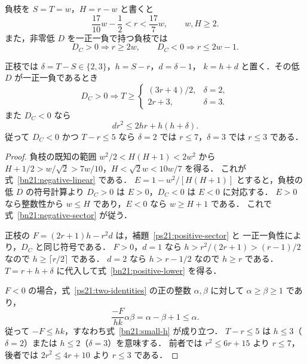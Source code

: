 \begin{lemma}[二つの枝の定量的不等式]\label{bn21:bounds}
負枝を $S=T=w$，$H=r-w$ と書くと
\begin{equation}\label{bn21:negative-linear}
 \frac{17}{10}w-\frac12<r<\frac{17}{7}w,
 \qquad w,H\ge2.
\end{equation}
また，非零低 $D$ を一正一負で持つ負枝では
\begin{equation}\label{bn21:negative-sector}
 D_C>0\Longrightarrow r\ge2w,\qquad
 D_C<0\Longrightarrow r\le2w-1.
\end{equation}

正枝では $\delta=T-S\in\{2,3\}$，$h=S-r$，$d=\delta-1$，
$k=h+d$ と置く．その低 $D$ が一正一負であるとき
\begin{equation}\label{bn21:positive-lower}
 D_C>0\Longrightarrow
 T\ge
 \begin{cases}
 (3r+4)/2,&\delta=2,\\
 2r+3,&\delta=3.
 \end{cases}
\end{equation}
また $D_C<0$ なら
\begin{equation}\label{bn21:small-h}
 d r^2\le2hr+h(h+\delta).
\end{equation}
従って $D_C<0$ かつ $T-r\le5$ なら
$\delta=2$ では $r\le7$，$\delta=3$ では $r\le3$ である．
\end{lemma}

\begin{proof}
負枝の既知の範囲 $w^2/2<H(H+1)<2w^2$ から
$H+1/2>w/\sqrt2>7w/10$，$H<\sqrt2w<10w/7$ を得る．
これが式~\eqref{bn21:negative-linear} である．
$E=1-w^2/[H(H+1)]$ とすると，負枝の低 $D$ の符号計算より
$D_C>0$ は $E>0$，$D_C<0$ は $E<0$ に対応する．
$E>0$ なら整数性から $w\le H$ であり，$E<0$ なら $w\ge H+1$ である．
これで式~\eqref{bn21:negative-sector} が従う．

正枝の $F=(2r+1)h-r^2d$ は，補題~\ref{ps21:positive-sector} と
一正一負性により，$D_C$ と同じ符号である．
$F>0$，$d=1$ なら
$h>r^2/(2r+1)>(r-1)/2$ なので $h\ge\lceil r/2\rceil$ である．
$d=2$ なら $h>r-1/2$ なので $h\ge r$ である．
$T=r+h+\delta$ に代入して式~\eqref{bn21:positive-lower} を得る．

$F<0$ の場合，式~\eqref{ps21:two-identities} の正の整数
$\alpha,\beta$ に対して $\alpha\ge\beta\ge1$ であり，
\[
 \frac{-F}{hk}\alpha\beta=\alpha-\beta+1\le\alpha.
\]
従って $-F\le hk$，すなわち式~\eqref{bn21:small-h} が成り立つ．
$T-r\le5$ は $h\le3$（$\delta=2$）または $h\le2$（$\delta=3$）を意味する．
前者では $r^2\le6r+15$ より $r\le7$，後者では
$2r^2\le4r+10$ より $r\le3$ である．
\end{proof}

